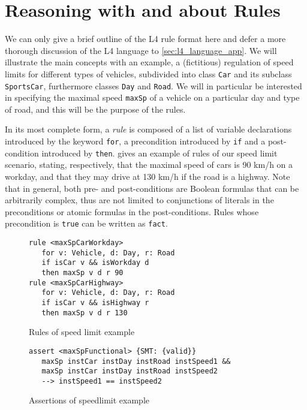 \section{Reasoning with and about Rules}\label{sec:resasoning_with_rules}

We can only give a brief outline of the L4 rule format here and defer a more
thorough discussion of the L4 language to \ref{sec:l4_language_app}.
We will illustrate the main concepts with an example, a (fictitious) regulation of speed
limits for different types of vehicles, subdivided into class \texttt{Car}
and its subclass \texttt{SportsCar}, furthermore classes \texttt{Day} and \texttt{Road}. We will
in particular be interested in specifying the maximal speed \texttt{maxSp} of
a vehicle on a particular day and type of road, and this will be the purpose
of the rules.

In its most complete form, a \emph{rule} is composed of a list of variable
declarations introduced by the keyword \texttt{for}, a precondition introduced
by \texttt{if} and a post-condition introduced by
\texttt{then}.  gives an example of rules of our speed limit
scenario, stating, respectively, that the maximal speed of cars is 90 km/h on a
workday,
and that they may drive at 130 km/h if the road is a highway.  Note that in
general, both pre- and post-conditions are Boolean formulas that can be
arbitrarily complex, thus are not limited to conjunctions of literals in the
preconditions or atomic formulas in the post-conditions.
Rules whose precondition is \texttt{true} can be written as \texttt{fact}.

\begin{figure}[h!]
  \begin{lstlisting}
rule <maxSpCarWorkday> 
   for v: Vehicle, d: Day, r: Road
   if isCar v && isWorkday d
   then maxSp v d r 90
rule <maxSpCarHighway>
   for v: Vehicle, d: Day, r: Road
   if isCar v && isHighway r
   then maxSp v d r 130
\end{lstlisting}
  \caption{Rules of speed limit example}\label{fig:rules}
\end{figure}

\begin{figure}[h]
\begin{lstlisting}
assert <maxSpFunctional> {SMT: {valid}}
   maxSp instCar instDay instRoad instSpeed1 &&
   maxSp instCar instDay instRoad instSpeed2
   --> instSpeed1 == instSpeed2
\end{lstlisting}
  \caption{Assertions of speedlimit example}\label{fig:assertions}
\end{figure}


